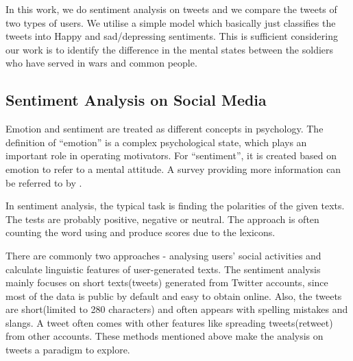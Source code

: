 In this work, we do sentiment analysis on tweets and we compare the tweets of
two types of users. We utilise a simple model which basically just classifies
the tweets into Happy and sad/depressing sentiments. This is sufficient
considering our work is to identify the difference in the mental states between
the soldiers who have served in wars and common people.

\subsection{Sentiment Analysis on Social Media}

Emotion and sentiment are treated as different concepts in psychology. The
definition of \enquote{emotion} is a complex psychological state, which plays an
important role in operating motivators. For \enquote{sentiment}, it is created based on
emotion to refer to a mental attitude. A survey providing more information can
be referred to by \citep{yue2018survey}.

In sentiment analysis, the typical task is finding the polarities of the given
texts. The tests are probably positive, negative or neutral. The approach is
often counting the word using and produce scores due to the lexicons.

There are commonly two approaches - analysing users' social activities and calculate linguistic features of user-generated texts. The sentiment analysis mainly focuses on short texts(tweets) generated from Twitter accounts, since most of the data is public by default and easy to obtain online. Also, the tweets are short(limited to 280 characters) and often appears with spelling mistakes and slangs. A tweet often comes with other features like spreading tweets(retweet) from other accounts. These methods mentioned above make the analysis on tweets a paradigm to explore.
